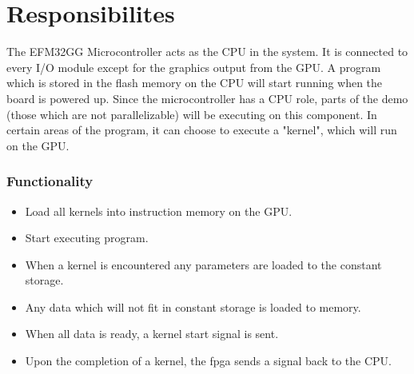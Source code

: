 \documentclass[../main/report.tex]{subfiles}
\begin{document}
\section{Responsibilites}

The EFM32GG Microcontroller acts as the CPU in the system.
It is connected to every I/O module except for the graphics output from the GPU.
A program which is stored in the flash memory on the CPU will start running when the board is powered up.
Since the microcontroller has a CPU role, parts of the demo (those which are not parallelizable)
will be executing on this component.
In certain areas of the program, it can choose to execute a "kernel", which will run on the GPU.

\subsubsection{Functionality}

\begin{itemize}
  \item Load all kernels into instruction memory on the GPU.
  \item Start executing program.
  \item When a kernel is encountered any parameters are loaded to the constant storage.
  \item Any data which will not fit in constant storage is loaded to memory.
  \item When all data is ready, a kernel start signal is sent.
  \item Upon the completion of a kernel, the fpga sends a signal back to the CPU.
\end{itemize}
\end{document}
